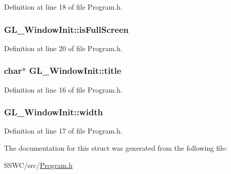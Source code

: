 Definition at line 18 of file Program.\+h.

\hypertarget{struct_g_l___window_init_a217a2406116f019e13094868c1810a32}{
\subsubsection[{is\+Full\+Screen}]{ G\+L\+\_\+\+Window\+Init\+::is\+Full\+Screen}}\label{struct_g_l___window_init_a217a2406116f019e13094868c1810a32}


Definition at line 20 of file Program.\+h.

\hypertarget{struct_g_l___window_init_a64c652d1fb4e2afa60b30fca91920ed4}{
\subsubsection[{title}]{\setlength{\rightskip}{0pt plus 5cm}char$\ast$ G\+L\+\_\+\+Window\+Init\+::title}}\label{struct_g_l___window_init_a64c652d1fb4e2afa60b30fca91920ed4}


Definition at line 16 of file Program.\+h.

\hypertarget{struct_g_l___window_init_a1a1c2cd5a8bc6b90987885307c296d9f}{
\subsubsection[{width}]{ G\+L\+\_\+\+Window\+Init\+::width}}\label{struct_g_l___window_init_a1a1c2cd5a8bc6b90987885307c296d9f}


Definition at line 17 of file Program.\+h.



The documentation for this struct was generated from the following file\+:\begin{DoxyCompactItemize}
\item 
S\+S\+W\+C/src/\hyperlink{_program_8h}{Program.\+h}\end{DoxyCompactItemize}
